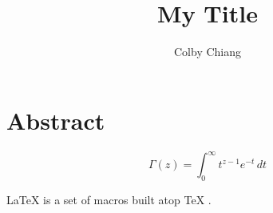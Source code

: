 \documentclass[a4paper,10pt]{article}
\title{My Title}
\author{Colby Chiang}
\begin{document}
\maketitle

\section{Abstract}
\lipsum[1]

\begin{equation}
    \Gamma(z) = \int_0^\infty t^{z-1} e^{-t}\,dt
\end{equation}

\lipsum[2]

\LaTeX{} \cite{latex2e} is a set of macros built atop \TeX{} \cite{texbook}.

\end{document}
